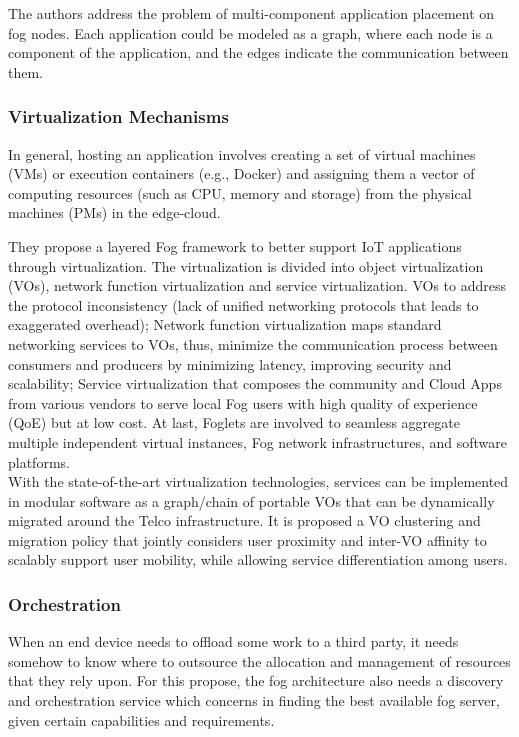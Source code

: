 \cite{bahreini2017efficient}
The authors address the problem of multi-component application placement on fog nodes. Each application could be modeled as a graph, where each node is a component of the application, and the edges indicate the communication between them.\\

\subsubsection{Virtualization Mechanisms}
In general, hosting an application involves creating a set of virtual machines (VMs) or execution containers (e.g., Docker) and assigning them a vector of computing resources (such as CPU, memory and storage) from the physical machines (PMs) in the edge-cloud.


\cite{li2018virtual}
They propose a layered Fog framework to better support IoT applications through virtualization. The virtualization is divided into object virtualization  (VOs), network function virtualization and service virtualization. VOs to address the protocol inconsistency (lack of unified networking protocols that leads to exaggerated overhead); Network function virtualization maps standard networking services to VOs, thus, minimize the communication process between consumers and producers by minimizing latency, improving security and scalability; Service virtualization that composes the community and Cloud Apps from various vendors to serve local Fog users with high quality of experience (QoE) but at low cost. At last, Foglets are involved to seamless aggregate multiple independent virtual instances, Fog network infrastructures, and software platforms.\\

\cite{bruschi2018move}
With the state-of-the-art virtualization technologies, services can be implemented in modular software as a graph/chain of portable VOs that can be dynamically migrated around the Telco infrastructure. It is proposed a VO clustering and migration policy that jointly considers user proximity and inter-VO affinity to scalably support user mobility, while allowing service differentiation among users.\\

\subsubsection{Orchestration}
\noindent\tab When an end device needs to offload some work to a third party, it needs somehow to know where to outsource the allocation and management of resources that they rely upon. For this propose, the fog architecture also needs a discovery and orchestration service which concerns in finding the best available fog server, given certain capabilities and requirements.\\

